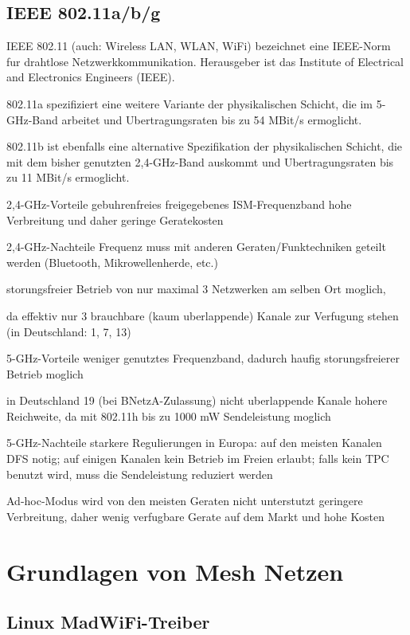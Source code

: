 \subsection{IEEE 802.11a/b/g}

IEEE 802.11 (auch: Wireless LAN, WLAN, WiFi) bezeichnet eine IEEE-Norm
fur drahtlose Netzwerkkommunikation. Herausgeber ist das Institute of
Electrical and Electronics Engineers (IEEE).

802.11a spezifiziert eine weitere Variante der physikalischen Schicht,
die im 5-GHz-Band arbeitet und Ubertragungsraten bis zu 54 MBit/s
ermoglicht. 


802.11b ist ebenfalls eine alternative Spezifikation der physikalischen
Schicht, die mit dem bisher genutzten 2,4-GHz-Band auskommt und
Ubertragungsraten bis zu 11 MBit/s ermoglicht. 


2,4-GHz-Vorteile 
gebuhrenfreies freigegebenes ISM-Frequenzband 
hohe Verbreitung und daher geringe Geratekosten 

2,4-GHz-Nachteile 
Frequenz muss mit anderen Geraten/Funktechniken geteilt werden (Bluetooth,
Mikrowellenherde, etc.) 

storungsfreier Betrieb von nur maximal 3 Netzwerken am selben Ort moglich, 

da effektiv nur 3 brauchbare (kaum uberlappende) Kanale zur Verfugung
stehen (in Deutschland: 1, 7, 13) 


5-GHz-Vorteile 
weniger genutztes Frequenzband, dadurch haufig storungsfreierer Betrieb
moglich 


in Deutschland 19 (bei BNetzA-Zulassung) nicht uberlappende Kanale 
hohere Reichweite, da mit 802.11h bis zu 1000 mW Sendeleistung moglich 

5-GHz-Nachteile 
starkere Regulierungen in Europa: auf den meisten Kanalen DFS notig; 
auf einigen Kanalen kein Betrieb im Freien erlaubt; falls kein TPC
benutzt wird, muss die Sendeleistung reduziert werden 

Ad-hoc-Modus wird von den meisten Geraten nicht unterstutzt 
geringere Verbreitung, daher wenig verfugbare Gerate auf dem Markt und
hohe Kosten 


\section{Grundlagen von Mesh Netzen}

\subsection{Linux MadWiFi-Treiber}

